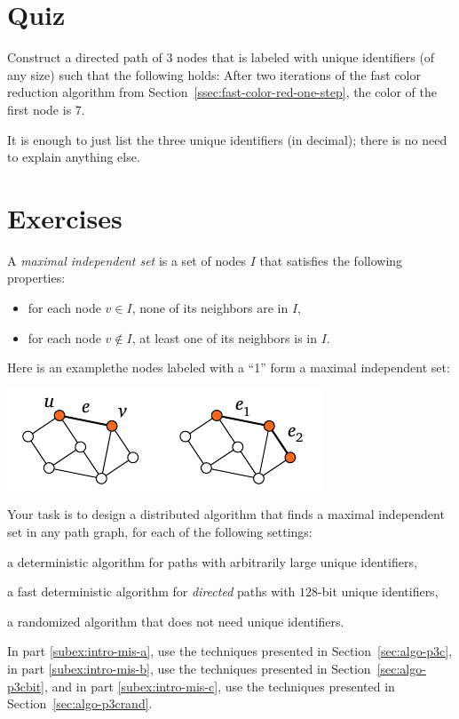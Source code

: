 \section{Quiz}

Construct a directed path of 3 nodes that is labeled with unique identifiers (of any size) such that the following holds: After two iterations of the fast color reduction algorithm from Section~\ref{ssec:fast-color-red-one-step}, the color of the first node is 7.

It is enough to just list the three unique identifiers (in decimal); there is no need to explain anything else.

\section{Exercises}

\begin{ex}\label{ex:intro-mis}
    A \emph{maximal independent set} is a set of nodes $I$ that satisfies the following properties:
    \begin{itemize}[noitemsep]
        \item for each node $v \in I$, none of its neighbors are in $I$,
        \item for each node $v \notin I$, at least one of its neighbors is in $I$.
    \end{itemize}
    Here is an example\mydash the nodes labeled with a ``1'' form a maximal independent set:
    \begin{center}
        \includegraphics[page=\PIntroMis]{figs.pdf}
    \end{center}
    Your task is to design a distributed algorithm that finds a maximal independent set in any path graph, for each of the following settings:
    \begin{subex}
        \item\label{subex:intro-mis-a} a deterministic algorithm for paths with arbitrarily large unique identifiers,
        \item\label{subex:intro-mis-b} a fast deterministic algorithm for \emph{directed} paths with $128$-bit unique identifiers,
        \item\label{subex:intro-mis-c} a randomized algorithm that does not need unique identifiers. 
    \end{subex}
    In part \ref{subex:intro-mis-a}, use the techniques presented in Section~\ref{sec:algo-p3c},
    in part \ref{subex:intro-mis-b}, use the techniques presented in Section~\ref{sec:algo-p3cbit}, and
    in part \ref{subex:intro-mis-c}, use the techniques presented in Section~\ref{sec:algo-p3crand}.
\end{ex}

